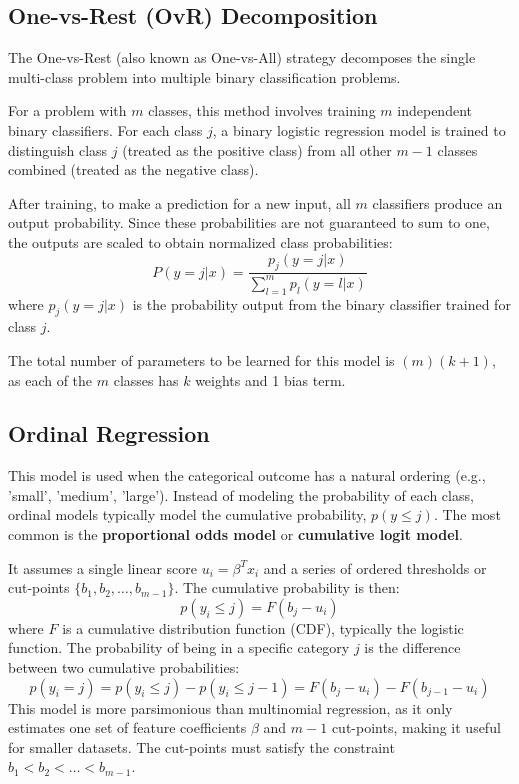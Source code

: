 \documentclass{article}
\begin{document}
\begin{multicols}{2}
\subsection{One-vs-Rest (OvR) Decomposition}
The One-vs-Rest (also known as One-vs-All) strategy decomposes the single multi-class problem into multiple binary classification problems.

For a problem with $m$ classes, this method involves training $m$ independent binary classifiers. For each class $j$, a binary logistic regression model is trained to distinguish class $j$ (treated as the positive class) from all other $m-1$ classes combined (treated as the negative class).

After training, to make a prediction for a new input, all $m$ classifiers produce an output probability. Since these probabilities are not guaranteed to sum to one, the outputs are scaled to obtain normalized class probabilities:
$$ P(y=j|x) = \frac{p_j(y=j|x)}{\sum_{l=1}^{m} p_l(y=l|x)} $$
where $p_j(y=j|x)$ is the probability output from the binary classifier trained for class $j$.

The total number of parameters to be learned for this model is $(m)(k+1)$, as each of the $m$ classes has $k$ weights and 1 bias term.


\subsection{Ordinal Regression}
This model is used when the categorical outcome has a natural ordering (e.g., 'small', 'medium', 'large'). Instead of modeling the probability of each class, ordinal models typically model the cumulative probability, $p(y \le j)$. The most common is the \textbf{proportional odds model} or \textbf{cumulative logit model}.

It assumes a single linear score $u_i = \beta^T x_i$ and a series of ordered thresholds or cut-points $\{b_1, b_2, \dots, b_{m-1}\}$. The cumulative probability is then:
$$ p(y_i \le j) = F(b_j - u_i) $$
where $F$ is a cumulative distribution function (CDF), typically the logistic function. The probability of being in a specific category $j$ is the difference between two cumulative probabilities:
$$ p(y_i = j) = p(y_i \le j) - p(y_i \le j-1) = F(b_j - u_i) - F(b_{j-1} - u_i) $$
This model is more parsimonious than multinomial regression, as it only estimates one set of feature coefficients $\beta$ and $m-1$ cut-points, making it useful for smaller datasets. The cut-points must satisfy the constraint $b_1 < b_2 < \dots < b_{m-1}$.


\end{multicols}
\end{document}
